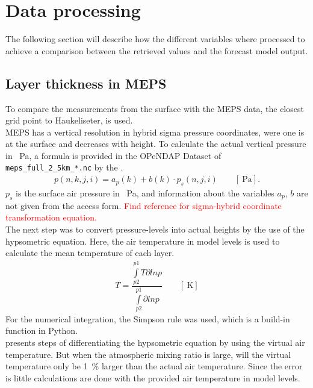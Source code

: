 \section{Data processing} \label{sec:data_proc}
The following section will describe how the different variables where processed to achieve a comparison between the retrieved values and the forecast model output. 

\subsection{Layer thickness in MEPS}\label{sec:layer_thickness}
To compare the measurements from the surface with the MEPS data, the closest grid point to Haukeliseter, is used.
\\
MEPS has a vertical resolution in hybrid sigma pressure coordinates, were one is at the surface and decreases with height. To calculate the actual vertical pressure in \SI{}{\Pa}, a formula is provided in the OPeNDAP Dataset of \texttt{meps\_full\_2\_5km\_*.nc} by the \cite{norwegian_meteorological_institute_met_2016}.  
\begin{align}
	p(n,k,j,i) = a_p(k) + b(k) \cdot p_s(n,j,i) \qquad [\SI{}{\Pa}].
	\label{eq:hybrid_sigma_pressure}
\end{align}
$p_s$ is the surface air pressure in \SI{}{\Pa}, and information about the variables $a_p$, $b$ are not given from the access form. \textcolor{red}{Find reference for sigma-hybrid coordinate transformation equation.}  
\\
The next step was to convert pressure-levels into actual heights by the use of the hypsometric equation. Here, the air temperature in model levels is used to calculate the mean temperature of each layer. 
\begin{align}
	\overline{T} = \dfrac{\int\limits_{p2}^{p1} T \partial ln p}{\int\limits_{p2}^{p1}\partial ln p} \qquad [\SI{}{\kelvin}]
	\label{eq:T_avg}
\end{align}
For the numerical integration, the Simpson rule was used, which is a build-in function in Python. \\
\cite{martin_mid-latitude_2006} presents steps of differentiating the hypsometric equation by using the virtual air temperature. But when the atmospheric mixing ratio is large, will the virtual temperature only be \SI{1}{\percent} larger than the actual air temperature. Since the error is little calculations are done with the provided air temperature in model levels.
